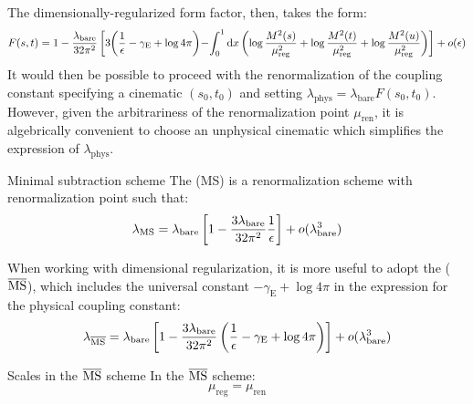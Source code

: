 The dimensionally-regularized form factor, then, takes the form:
\begin{equation*}
  F(s,t) = 1 - \frac{\lambda_\text{bare}}{32\pi^2} \left[ 3 \hspace{-0.2em} \left( \frac{1}{\epsilon} - \gamma_\text{E} + \log 4\pi \right) \hspace{-0.2em} - \hspace{-0.2em} \int_0^1 \mathrm{d} x \left( \log \frac{M^2(s)}{\mu_\text{reg}^2} + \log \frac{M^2(t)}{\mu_\text{reg}^2} + \log \frac{M^2(u)}{\mu_\text{reg}^2} \right) \right] + o(\epsilon)
\end{equation*}
It would then be possible to proceed with the renormalization of the coupling constant specifying a cinematic $ (s_0,t_0) $ and setting $ \lambda_\text{phys} = \lambda_\text{bare} F(s_0,t_0) $. However, given the arbitrariness of the renormalization point $ \mu_\text{ren} $, it is algebrically convenient to choose an unphysical cinematic which simplifies the expression of $ \lambda_\text{phys} $.

\begin{definition}{Minimal subtraction scheme}{}
  The  (MS) is a renormalization scheme with renormalization point such that:
  \begin{equation}
    \lambda_\text{MS} = \lambda_\text{bare} \left[ 1 - \frac{3\lambda_\text{bare}}{32\pi^2} \frac{1}{\epsilon} \right] + o(\lambda_\text{bare}^3)
  \end{equation}
\end{definition}

When working with dimensional regularization, it is more useful to adopt the  ($ \overline{\text{MS}} $), which includes the universal constant $ -\gamma_\text{E} + \log 4\pi $ in the expression for the physical coupling constant:
\begin{equation}
  \lambda_{\overline{\text{MS}}} = \lambda_\text{bare} \left[ 1 - \frac{3\lambda_\text{bare}}{32\pi^2} \left( \frac{1}{\epsilon} - \gamma_\text{E} + \log 4\pi \right) \right] + o(\lambda_\text{bare}^3)
  \label{eq:l-msb}
\end{equation}

\begin{theorem}{Scales in the $ \overline{\text{MS}} $ scheme}{}
  In the $ \overline{\text{MS}} $ scheme:
  \begin{equation}
    \mu_\text{reg} = \mu_\text{ren}
  \end{equation}
\end{theorem}

